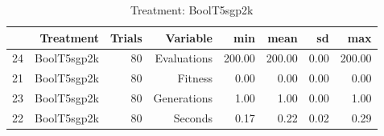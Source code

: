 \begin{table}[ht]
\centering
\begin{tabular}{rrrrrrrr}
  \hline
 & Treatment & Trials & Variable & min & mean & sd & max \\ 
  \hline
24 & BoolT5sgp2k &  80 & Evaluations & 200.00 & 200.00 & 0.00 & 200.00 \\ 
  21 & BoolT5sgp2k &  80 & Fitness & 0.00 & 0.00 & 0.00 & 0.00 \\ 
  23 & BoolT5sgp2k &  80 & Generations & 1.00 & 1.00 & 0.00 & 1.00 \\ 
  22 & BoolT5sgp2k &  80 & Seconds & 0.17 & 0.22 & 0.02 & 0.29 \\ 
   \hline
\end{tabular}
\caption{Treatment: BoolT5sgp2k} 
\end{table}
